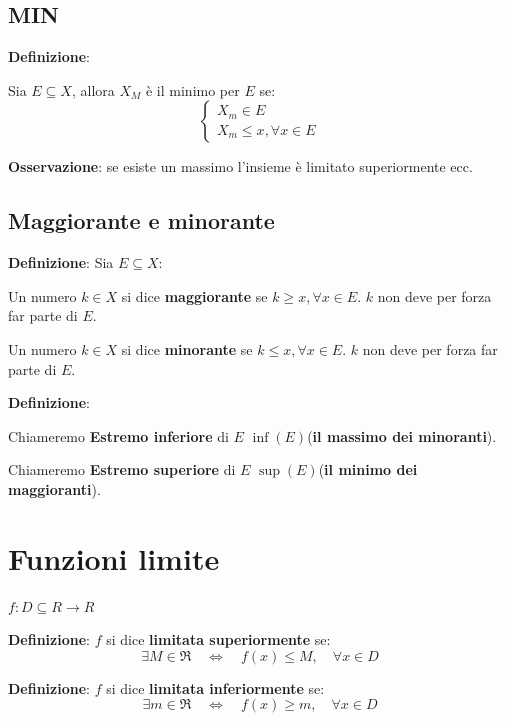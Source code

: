 \subsection{MIN}
\textbf{Definizione}:

Sia $E \subseteq X$, allora $X_M$ è il minimo per $E$ se:
\begin{equation*}
    \begin{cases}
        X_m \in E \\
        X_m \leq x, \forall x \in E
    \end{cases}
\end{equation*}

\textbf{Osservazione}: se esiste un massimo l'insieme è limitato superiormente ecc.

\subsection{Maggiorante e minorante}

\textbf{Definizione}:
Sia $E \subseteq X$:

Un numero $k \in X$ si dice \textbf{maggiorante} se $k \geq x, \forall x \in E$.
$k$ non deve per forza far parte di $E$.



Un numero $k \in X$ si dice \textbf{minorante} se $k \leq x, \forall x \in E$.
$k$ non deve per forza far parte di $E$.



\textbf{Definizione}:

Chiameremo \textbf{Estremo inferiore} di $E$ $\inf(E)$(\textbf{il massimo dei minoranti}).


Chiameremo \textbf{Estremo superiore} di $E$ $\sup(E)$(\textbf{il minimo dei maggioranti}).


\section{Funzioni limite}

$f: D \subseteq R \rightarrow R$

\textbf{Definizione}:
$f$ si dice \textbf{limitata superiormente} se:
\begin{equation*}
    \exists M \in \Re \quad \Leftrightarrow \quad f(x) \leq M, \quad \forall x \in D
\end{equation*}

\textbf{Definizione}:
$f$ si dice \textbf{limitata inferiormente} se:
\begin{equation*}
    \exists m \in \Re \quad \Leftrightarrow \quad f(x) \geq m, \quad \forall x \in D
\end{equation*}

